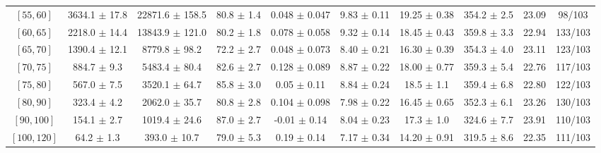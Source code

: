 \begin{tabular}{c||c|c|c|c|c|c|c||c|c}
$[55, 60]$ & 3634.1 $\pm$ 17.8 & 22871.6 $\pm$ 158.5 & 80.8 $\pm$ 1.4 & 0.048 $\pm$ 0.047 & 9.83 $\pm$ 0.11 & 19.25 $\pm$ 0.38 & 354.2 $\pm$ 2.5 & 23.09 & 98/103\\
$[60, 65]$ & 2218.0 $\pm$ 14.4 & 13843.9 $\pm$ 121.0 & 80.2 $\pm$ 1.8 & 0.078 $\pm$ 0.058 & 9.32 $\pm$ 0.14 & 18.45 $\pm$ 0.43 & 359.8 $\pm$ 3.3 & 22.94 & 133/103\\
$[65, 70]$ & 1390.4 $\pm$ 12.1 & 8779.8 $\pm$ 98.2 & 72.2 $\pm$ 2.7 & 0.048 $\pm$ 0.073 & 8.40 $\pm$ 0.21 & 16.30 $\pm$ 0.39 & 354.3 $\pm$ 4.0 & 23.11 & 123/103\\
$[70, 75]$ & 884.7 $\pm$ 9.3 & 5483.4 $\pm$ 80.4 & 82.6 $\pm$ 2.7 & 0.128 $\pm$ 0.089 & 8.87 $\pm$ 0.22 & 18.00 $\pm$ 0.77 & 359.3 $\pm$ 5.4 & 22.76 & 117/103\\
$[75, 80]$ & 567.0 $\pm$ 7.5 & 3520.1 $\pm$ 64.7 & 85.8 $\pm$ 3.0 & 0.05 $\pm$ 0.11 & 8.84 $\pm$ 0.24 & 18.5 $\pm$ 1.1 & 359.4 $\pm$ 6.8 & 22.80 & 122/103\\
$[80, 90]$ & 323.4 $\pm$ 4.2 & 2062.0 $\pm$ 35.7 & 80.8 $\pm$ 2.8 & 0.104 $\pm$ 0.098 & 7.98 $\pm$ 0.22 & 16.45 $\pm$ 0.65 & 352.3 $\pm$ 6.1 & 23.26 & 130/103\\
$[90, 100]$ & 154.1 $\pm$ 2.7 & 1019.4 $\pm$ 24.6 & 87.0 $\pm$ 2.7 & -0.01 $\pm$ 0.14 & 8.04 $\pm$ 0.23 & 17.3 $\pm$ 1.0 & 324.6 $\pm$ 7.7 & 23.91 & 110/103\\
$[100, 120]$ & 64.2 $\pm$ 1.3 & 393.0 $\pm$ 10.7 & 79.0 $\pm$ 5.3 & 0.19 $\pm$ 0.14 & 7.17 $\pm$ 0.34 & 14.20 $\pm$ 0.91 & 319.5 $\pm$ 8.6 & 22.35 & 111/103\\
\end{tabular}
